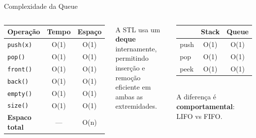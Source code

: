 \documentclass[aspectratio=169,10pt]{beamer}
\begin{document}
\begin{frame}{Complexidade da Queue}
  \begin{columns}[c]
      \begin{tcolorbox}[caixaAzul,title={Tabela de Complexidade}]
        \centering\footnotesize
        \begin{tabular}{lcc}
          \toprule
          \textbf{Operação} & \textbf{Tempo} & \textbf{Espaço}\\
          \midrule
          \texttt{push(x)}  & O(1) & O(1)\\
          \texttt{pop()}    & O(1) & O(1)\\
          \texttt{front()}  & O(1) & O(1)\\
          \texttt{back()}   & O(1) & O(1)\\
          \texttt{empty()}  & O(1) & O(1)\\
          \texttt{size()}   & O(1) & O(1)\\
          \midrule
          \textbf{Espaco total} & --- & O(n)\\
          \bottomrule
        \end{tabular}
      \end{tcolorbox}
      \vspace{0.1cm}
      \begin{tcolorbox}[caixaVerde,title={Por que tudo e O(1)?}]
        \small
        A STL usa um \textbf{deque} internamente,
        permitindo inserção e remoção eficiente
        em ambas as extremidades.
      \end{tcolorbox}
      \begin{tcolorbox}[caixaAmarelo,title={Stack vs Queue --- mesma eficiencia}]
        \footnotesize
        \begin{tabular}{lcc}
          \toprule
          & \textbf{Stack} & \textbf{Queue}\\
          \midrule
          push & O(1) & O(1)\\
          pop  & O(1) & O(1)\\
          peek & O(1) & O(1)\\
          \bottomrule
        \end{tabular}\\[5pt]
        A diferença é \textbf{comportamental}:\\
        LIFO vs FIFO.

\end{tcolorbox}
\end{columns}
\end{frame}
\end{document}
